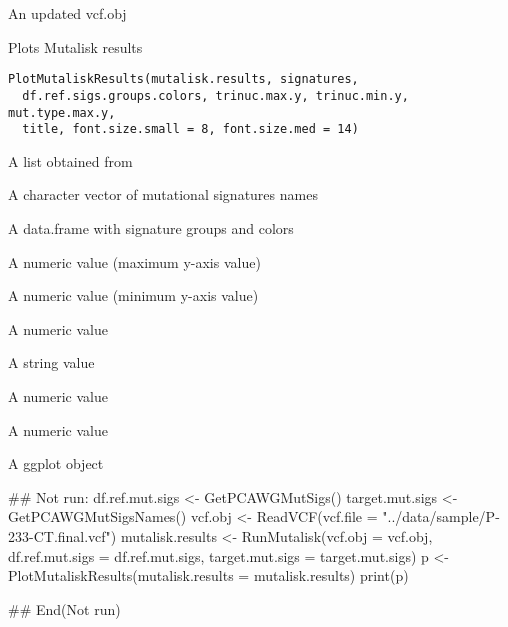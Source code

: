 \documentclass[letterpaper]{book}
\begin{document}
%
\begin{Value}
An updated vcf.obj
\end{Value}
%
\begin{Description}\relax
Plots Mutalisk results
\end{Description}
%
\begin{Usage}
\begin{verbatim}
PlotMutaliskResults(mutalisk.results, signatures,
  df.ref.sigs.groups.colors, trinuc.max.y, trinuc.min.y, mut.type.max.y,
  title, font.size.small = 8, font.size.med = 14)
\end{verbatim}
\end{Usage}
%
\begin{Arguments}
\begin{ldescription}
\item[\code{mutalisk.results}] A list obtained from 

\item[\code{signatures}] A character vector of mutational signatures names

\item[\code{df.ref.sigs.groups.colors}] A data.frame with signature groups and colors

\item[\code{trinuc.max.y}] A numeric value (maximum y-axis value)

\item[\code{trinuc.min.y}] A numeric value (minimum y-axis value)

\item[\code{mut.type.max.y}] A numeric value

\item[\code{title}] A string value

\item[\code{font.size.small}] A numeric value

\item[\code{font.size.med}] A numeric value
\end{ldescription}
\end{Arguments}
%
\begin{Value}
A ggplot object
\end{Value}
%
\begin{Examples}
\begin{ExampleCode}
## Not run: 
  df.ref.mut.sigs <- GetPCAWGMutSigs()
  target.mut.sigs <- GetPCAWGMutSigsNames()
  vcf.obj <- ReadVCF(vcf.file = "../data/sample/P-233-CT.final.vcf")
  mutalisk.results <- RunMutalisk(vcf.obj = vcf.obj,
                                  df.ref.mut.sigs = df.ref.mut.sigs,
                                  target.mut.sigs = target.mut.sigs)
  p <- PlotMutaliskResults(mutalisk.results = mutalisk.results)
  print(p)

## End(Not run)
\end{ExampleCode}
\end{Examples}
\end{document}
